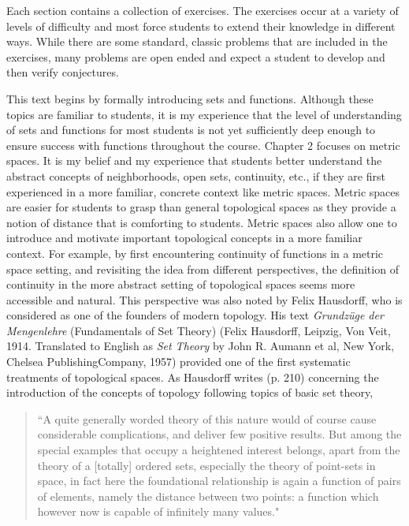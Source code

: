 Each section contains a collection of exercises. The exercises occur at a variety of levels of difficulty and most force students to extend their knowledge in different ways. While there are some standard, classic problems that are included in the exercises, many problems are open ended and expect a student to develop and then verify conjectures. 

This text begins by formally introducing sets and functions. Although these topics are familiar to students, it is my experience that the level of understanding of sets and functions for most students is not yet sufficiently deep enough to ensure success with functions throughout the course. Chapter 2 focuses on metric spaces. It is my belief and my experience that students better understand the abstract concepts of neighborhoods, open sets, continuity, etc., if they are first experienced in a more familiar, concrete context like metric spaces. Metric spaces are easier for students to grasp than general topological spaces as they provide a notion of distance that is comforting to students. Metric spaces also allow one to introduce and motivate important topological concepts in a more familiar context. For example, by first encountering continuity of functions in a metric space setting, and revisiting the idea from different perspectives, the definition of continuity in the more abstract setting of topological spaces seems more accessible and natural. This perspective was also noted by Felix Hausdorff, who is considered as one of the founders of modern topology. His text \emph{Grundz\"{u}ge der Mengenlehre} (Fundamentals of Set Theory) (Felix Hausdorff, Leipzig, Von Veit, 1914. Translated to English as \emph{Set Theory} by John R. Aumann et al, New York, Chelsea PublishingCompany, 1957) provided one of the first systematic treatments of topological spaces. As Hausdorff writes (p. 210) concerning the introduction of the concepts of topology following topics of basic set theory, 
\begin{quote}
``A quite generally worded theory of this nature would of course cause considerable complications, and deliver few positive results. But among the special examples that occupy a heightened interest belongs, apart from the theory of a [totally] ordered sets, especially the theory of point-sets in space, in fact here the foundational relationship is again a function of pairs of elements, namely the distance between two points: a function which however now is capable of infinitely many values."
\end{quote}

